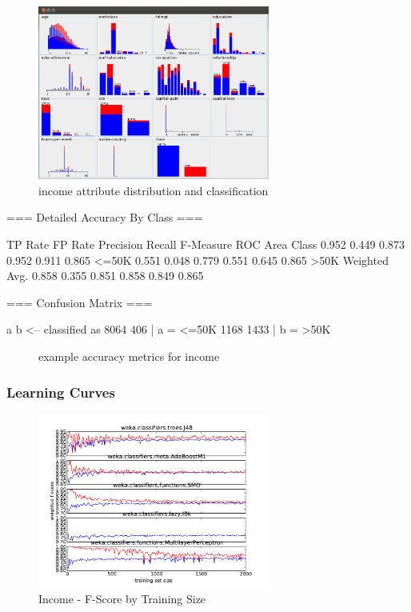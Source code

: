 \documentclass{sig-alternate}
\begin{document}
\begin{figure}[!htbp]
    \centering
    \includegraphics[width=3in]{data/adult/ad-data-viz.png}
    \caption{income attribute distribution and classification \label{ad-data-viz}}
\end{figure} 

\tiny
\begin{verbbox}

=== Detailed Accuracy By Class ===

               TP Rate   FP Rate   Precision   Recall  F-Measure   ROC Area  Class
                 0.952     0.449      0.873     0.952     0.911      0.865     <=50K
                 0.551     0.048      0.779     0.551     0.645      0.865     >50K
Weighted Avg.    0.858     0.355      0.851     0.858     0.849      0.865

=== Confusion Matrix ===

    a    b   <-- classified as
 8064  406 |    a =  <=50K
 1168 1433 |    b =  >50K

\end{verbbox}
\normalsize

\begin{figure}[!htbp]
    \centering
    \theverbbox
    \caption{example accuracy metrics for income \label{ad-metrics}}
\end{figure}


\subsubsection{Learning Curves}

\begin{figure}[!htbp]
    \centering
    \includegraphics[width=3in]{data/adult/learning-curve-10to2000/stacked-fscore.pdf}
    \caption{Income - F-Score by Training Size \label{ad-error}}
\end{figure} 
\end{document}

